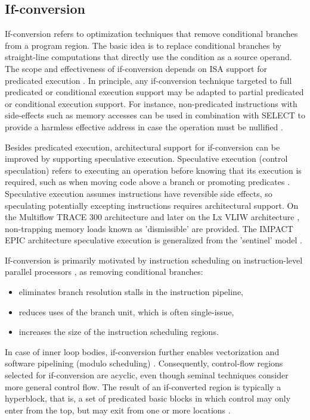 \subsection{If-conversion}

If-conversion refers to optimization techniques that remove conditional branches
from a program region. The basic idea is to replace conditional branches by
straight-line computations that directly use the condition as a source operand.
The scope and effectiveness of if-conversion depends on ISA support for
predicated execution \cite{Mahlke:1995:ISCA}. In principle, any if-conversion
technique targeted to full predicated or conditional execution support may be
adapted to partial predicated or conditional execution support. For instance,
non-predicated instructions with side-effects such as memory accesses can be
used in combination with SELECT to provide a harmless effective address in case
the operation must be nullified \cite{Mahlke:1995:ISCA}.

Besides predicated execution, architectural support for if-conversion can be
improved by supporting speculative execution. Speculative execution (control
speculation) refers to executing an operation before knowing that its execution
is required, such as when moving code above a branch \cite{Lowney:1993:JS} or
promoting predicates \cite{Mahlke:1995:ISCA}.  Speculative execution assumes
instructions have reversible side effects, so speculating potentially excepting
instructions requires architectural support. On the Multiflow TRACE 300
architecture and later on the Lx VLIW architecture \cite{Faraboschi:2000:ISCA},
non-trapping memory loads known as 'dismissible' are provided. The IMPACT EPIC
architecture speculative execution \cite{August:1998:ISCA} is generalized from
the 'sentinel' model \cite{Mahlke:1992:ASPLOS}.

If-conversion is primarily motivated by instruction scheduling on
instruction-level parallel processors \cite{Mahlke:1995:ISCA}, as removing
conditional branches: \begin{itemize} \item eliminates branch resolution stalls
in the instruction pipeline, \item reduces uses of the branch unit, which is
often single-issue, \item increases the size of the instruction scheduling
regions.  \end{itemize} In case of inner loop bodies, if-conversion further
enables vectorization \cite{Allen:1983:POPL} and software pipelining (modulo
scheduling) \cite{Park:1991:TR58}. Consequently, control-flow regions selected
for if-conversion are acyclic, even though seminal techniques
\cite{Allen:1983:POPL, Park:1991:TR58} consider more general control flow.
The result of an if-converted region is typically a hyperblock, that is, a set
of predicated basic blocks in which control may only enter from the top, but may
exit from one or more locations \cite{Mahlke:1992:MICRO}.
\medskip

